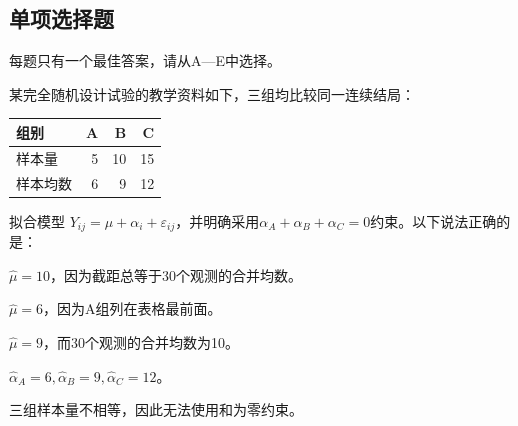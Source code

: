 \subsection{单项选择题}
每题只有一个最佳答案，请从A—E中选择。

\par\noindent\begin{minipage}{\linewidth}
某完全随机设计试验的教学资料如下，三组均比较同一连续结局：
\begin{center}\begin{tabular}{lrrr}
\toprule 组别&A&B&C\\\midrule
样本量&5&10&15\\
样本均数&6&9&12\\\bottomrule
\end{tabular}\end{center}
拟合模型 \(Y_{ij}=\mu+\alpha_i+\varepsilon_{ij}\)，并明确采用\(\alpha_A+\alpha_B+\alpha_C=0\)约束。以下说法正确的是：
\begin{choices}
\item \(\widehat\mu=10\)，因为截距总等于30个观测的合并均数。
\item \(\widehat\mu=6\)，因为A组列在表格最前面。
\item \(\widehat\mu=9\)，而30个观测的合并均数为10。
\item \(\widehat\alpha_A=6,\widehat\alpha_B=9,\widehat\alpha_C=12\)。
\item 三组样本量不相等，因此无法使用和为零约束。
\end{choices}
\end{minipage}\par\medskip

